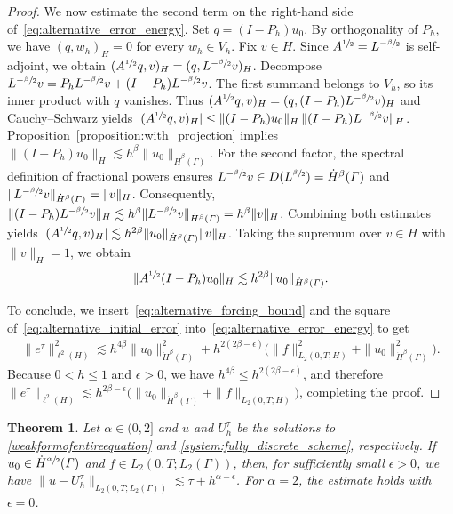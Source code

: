 \documentclass[numbers,webpdf]{ima-authoring-template}%
\theoremstyle{thmstyletwo}%
\newtheorem{theorem}{Theorem}%
\numberwithin{equation}{section}
\begin{document}
\begin{proof}
    We now estimate the second term on the right-hand side of~\eqref{eq:alternative_error_energy}. Set $q=(I-P_h)u_0$. By orthogonality of $P_h$, we have $(q,w_h)_H=0$ for every $w_h\in V_h$. Fix $v\in H$. Since $A^{\sfrac12}=L^{-\sfrac{\beta}{2}}$ is self-adjoint, we obtain $(A^{\sfrac12}q,v)_H=(q,L^{-\sfrac{\beta}{2}}v)_H$. Decompose $L^{-\sfrac{\beta}{2}}v=P_hL^{-\sfrac{\beta}{2}}v+(I-P_h)L^{-\sfrac{\beta}{2}}v$. The first summand belongs to $V_h$, so its inner product with $q$ vanishes. Thus $(A^{\sfrac12}q,v)_H=(q,(I-P_h)L^{-\sfrac{\beta}{2}}v)_H$ and Cauchy--Schwarz yields $|(A^{\sfrac12}q,v)_H|\leq\|(I-P_h)u_0\|_H\,\|(I-P_h)L^{-\sfrac{\beta}{2}}v\|_H$. Proposition~\ref{proposition:with_projection} implies $ \|(I-P_h)u_0\|_H\lesssim h^\beta\|u_0\|_{\dot H^\beta(\Gamma)}$. For the second factor, the spectral definition of fractional powers ensures $L^{-\sfrac{\beta}{2}}v\in D(L^{\sfrac{\beta}{2}})=\dot H^\beta({\mit\varGamma})$ and $\|L^{-\sfrac{\beta}{2}}v\|_{\dot H^\beta({\mit\varGamma})}=\|v\|_H$. Consequently, $ \|(I-P_h)L^{-\sfrac{\beta}{2}}v\|_H\lesssim h^\beta\|L^{-\sfrac{\beta}{2}}v\|_{\dot H^\beta({\mit\varGamma})}
    =h^\beta\|v\|_H$. Combining both estimates yields $|(A^{\sfrac12}q,v)_H|\lesssim h^{2\beta}\|u_0\|_{\dot H^\beta({\mit\varGamma})}\|v\|_H$. Taking the supremum over $v\in H$ with $\|v\|_H=1$, we obtain
    \begin{align}
    \label{eq:alternative_initial_error}
    \|A^{\sfrac12}(I-P_h)u_0\|_H
    \lesssim h^{2\beta}\|u_0\|_{\dot H^\beta({\mit\varGamma})}.
    \end{align}

    To conclude, we insert~\eqref{eq:alternative_forcing_bound} and the square of~\eqref{eq:alternative_initial_error} into~\eqref{eq:alternative_error_energy} to get
    \begin{align*}
    \|e^\tau\|_{\ell^2(H)}^2
    \lesssim h^{4\beta}\|u_0\|_{\dot H^\beta(\Gamma)}^2+h^{2(2\beta-\epsilon)}
    \big(\|f\|_{L_2(0,T;H)}^2+\|u_0\|_{\dot H^\beta(\Gamma)}^2\big).
    \end{align*}
    Because $0<h\leq1$ and $\epsilon>0$, we have $h^{4\beta}\leq h^{2(2\beta-\epsilon)}$, and therefore $\|e^\tau\|_{\ell^2(H)}\lesssim h^{2\beta-\epsilon}\big(\|u_0\|_{\dot H^\beta(\Gamma)}+\|f\|_{L_2(0,T;H)}\big)$, completing the proof.
    \hfill
\end{proof}
\begin{theorem}
\label{theorem:theorem_about_error_bounded_by_tau_plus_h_alpha}
Let $\alpha\in(0,2]$ and $u$ and $U_h^\tau$ be the solutions to \eqref{weakformofentireequation} and \eqref{system:fully_discrete_scheme}, respectively. If $u_0\in\dot{H}^{\sfrac{\alpha}{2}}({\mit\varGamma})$ and $f\in L_2(0,T;L_2(\Gamma))$, then, for sufficiently small $\epsilon>0$, we have $\|u-U_h^\tau\|_{L_2(0,T;L_2(\Gamma))}\lesssim \tau+h^{\alpha-\epsilon}$. For $\alpha=2$, the estimate holds with $\epsilon=0$.
\end{theorem}
\end{document}
